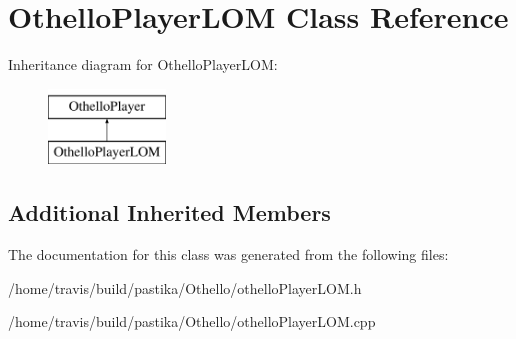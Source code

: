 \hypertarget{classOthelloPlayerLOM}{\section{Othello\-Player\-L\-O\-M Class Reference}
\label{classOthelloPlayerLOM}
}
Inheritance diagram for Othello\-Player\-L\-O\-M\-:\begin{figure}[H]
\begin{center}
\leavevmode
\includegraphics[height=2.000000cm]{classOthelloPlayerLOM}
\end{center}
\end{figure}
\subsection*{Additional Inherited Members}


The documentation for this class was generated from the following files\-:\begin{DoxyCompactItemize}
\item 
/home/travis/build/pastika/\-Othello/othello\-Player\-L\-O\-M.\-h\item 
/home/travis/build/pastika/\-Othello/othello\-Player\-L\-O\-M.\-cpp\end{DoxyCompactItemize}
